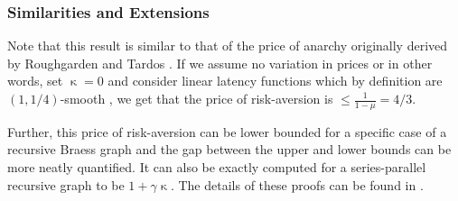 \subsubsection{Similarities and Extensions} Note that this result is similar to that of the price of anarchy originally derived by Roughgarden and Tardos \cite{tardos}. If we assume no variation in prices or in other words, 
set $\upkappa = 0$ and consider linear latency functions which by definition are $(1, 1/4)$-smooth \cite{tardos-notes}, we get that the price of risk-aversion is $\leq \displaystyle \frac{1}{1 - \mu} = 4/3$.

Further, this price of risk-aversion can be lower bounded for a specific case of a recursive Braess graph  and the gap between the upper and
lower bounds can be more neatly quantified. It can also be exactly computed for a series-parallel recursive graph to be $1 + \gamma \upkappa$. The details of these proofs can be found
in \cite{risk-averse}.
